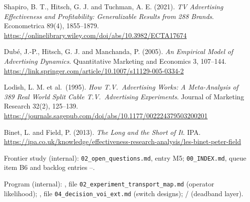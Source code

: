 \begin{enumerate}[label={[\arabic*]},leftmargin=2.5em]
\item Shapiro, B. T., Hitsch, G. J. and Tuchman, A. E. (2021). \emph{TV Advertising Effectiveness and Profitability: Generalizable Results from 288 Brands}. Econometrica 89(4), 1855--1879. \url{https://onlinelibrary.wiley.com/doi/abs/10.3982/ECTA17674}
\item Dub\'e, J.-P., Hitsch, G. J. and Manchanda, P. (2005). \emph{An Empirical Model of Advertising Dynamics}. Quantitative Marketing and Economics 3, 107--144. \url{https://link.springer.com/article/10.1007/s11129-005-0334-2}
\item Lodish, L. M. et al.\ (1995). \emph{How T.V.\ Advertising Works: A Meta-Analysis of 389 Real World Split Cable T.V.\ Advertising Experiments}. Journal of Marketing Research 32(2), 125--139. \url{https://journals.sagepub.com/doi/abs/10.1177/002224379503200201}
\item Binet, L. and Field, P. (2013). \emph{The Long and the Short of It}. IPA. \url{https://ipa.co.uk/knowledge/effectiveness-research-analysis/les-binet-peter-field}
\item Frontier study (internal): \texttt{02\_open\_questions.md}, entry M5; \texttt{00\_INDEX.md}, queue item B6 and backlog entries --.
\item Program (internal): , file \texttt{02\_experiment\_transport\_map.md} (operator likelihood); , file \texttt{04\_decision\_voi\_ext.md} (switch designs); / (deadband layer).
\end{enumerate}
\endgroup
